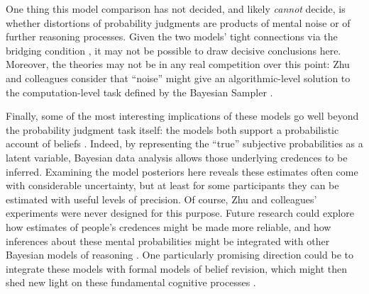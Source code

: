 \documentclass[
  english,
  man,floatsintext]{apa6}
\begin{document}
One thing this model comparison has not decided, and likely \emph{cannot} decide, is whether distortions of probability judgments are products of mental noise or of further reasoning processes. Given the two models' tight connections via the bridging condition \autocite{zhu.etal2020}, it may not be possible to draw decisive conclusions here. Moreover, the theories may not be in any real competition over this point: Zhu and colleagues consider that ``noise'' might give an algorithmic-level solution to the computation-level task defined by the Bayesian Sampler \autocite*{zhu.etal2020}.

Finally, some of the most interesting implications of these models go well beyond the probability judgment task itself: the models both support a probabilistic account of beliefs \autocite{chater.etal2020}. Indeed, by representing the ``true'' subjective probabilities as a latent variable, Bayesian data analysis allows those underlying credences to be inferred. Examining the model posteriors here reveals these estimates often come with considerable uncertainty, but at least for some participants they can be estimated with useful levels of precision. Of course, Zhu and colleagues' \autocite*{zhu.etal2020} experiments were never designed for this purpose. Future research could explore how estimates of people's credences might be made more reliable, and how inferences about these mental probabilities might be integrated with other Bayesian models of reasoning \autocites[e.g.][]{franke.etal2016,jern.etal2014,griffiths.tenenbaum2006}. One particularly promising direction could be to integrate these models with formal models of belief revision, which might then shed new light on these fundamental cognitive processes \autocites[e.g.][]{cook.lewandowsky2016,jern.etal2014,powell.etal2018}.


\printbibliography
\end{document}

